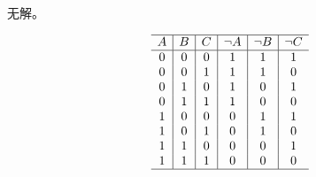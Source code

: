 {{        %
        \begin{practices}
            无解。

            \begin{table}[H]
                \[
                    \begin{array}{c|c|c|c|c|c}
                        \hline
                        A & B & C & \neg A & \neg B & \neg C \\
                        \hline
                        0 & 0 & 0 & 1 & 1 & 1 \\
                        0 & 0 & 1 & 1 & 1 & 0 \\
                        0 & 1 & 0 & 1 & 0 & 1 \\
                        0 & 1 & 1 & 1 & 0 & 0 \\
                        1 & 0 & 0 & 0 & 1 & 1 \\
                        1 & 0 & 1 & 0 & 1 & 0 \\
                        1 & 1 & 0 & 0 & 0 & 1 \\
                        1 & 1 & 1 & 0 & 0 & 0 \\
                        \hline
                   \end{array}
               \]
            \end{table}
        \end{practices}
    }
}
